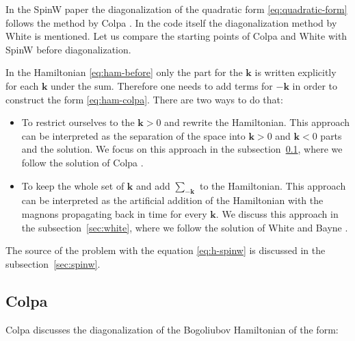 \documentclass[a4paper,12pt]{article}
\begin{document}
        In the SpinW paper the diagonalization of the quadratic form \eqref{eq:quadratic-form} follows the method by Colpa \cite{colpa1978diagonalization}. 
        In the code itself the diagonalization method by White \cite{white1983quantum} is mentioned.
        Let us compare the starting points of Colpa and White with SpinW before diagonalization. 

        In the Hamiltonian \eqref{eq:ham-before} only the part for the $\boldsymbol{k}$ is written explicitly for each $\boldsymbol{k}$ under the sum. 
        Therefore one needs to add terms for $-\boldsymbol{k}$ in order to construct the form \eqref{eq:ham-colpa}. 
        There are two ways to do that:

        \begin{itemize}
            \item To restrict ourselves to the $\boldsymbol{k} > 0$ and rewrite the Hamiltonian. 
            This approach can be interpreted as the separation of the space into $\boldsymbol{k} > 0$ and $\boldsymbol{k} < 0$ parts and the solution. 
            We focus on this approach in the subsection~\ref{sec:colpa}, where we follow the solution of Colpa \cite{colpa1978diagonalization}.

            \item To keep the whole set of $\boldsymbol{k}$ and add $\sum_{-\boldsymbol{k}}$ to the Hamiltonian.
            This approach can be interpreted as the artificial addition of the Hamiltonian with the magnons propagating back in time for every $\boldsymbol{k}$.
            We discuss this approach in the subsection~\ref{sec:white}, where we follow the solution of White and Bayne \cite{white1983quantum}.
        \end{itemize}

        The source of the problem with the equation \eqref{eq:h-spinw} is discussed in the subsection~\ref{sec:spinw}.
        
        \subsection{Colpa \cite{colpa1978diagonalization}}\label{sec:colpa}
        
            Colpa discusses the diagonalization of the Bogoliubov Hamiltonian of the form:
\end{document}
